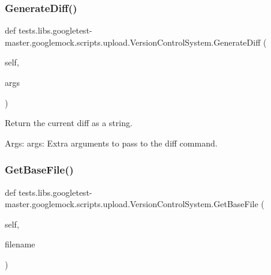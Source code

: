 \subsubsection{\texorpdfstring{Generate\+Diff()}{GenerateDiff()}}
{\footnotesize\ttfamily def tests.\+libs.\+googletest-\/master.\+googlemock.\+scripts.\+upload.\+Version\+Control\+System.\+Generate\+Diff (\begin{DoxyParamCaption}\item[{}]{self,  }\item[{}]{args }\end{DoxyParamCaption})}

\begin{DoxyVerb}Return the current diff as a string.

Args:
  args: Extra arguments to pass to the diff command.
\end{DoxyVerb}
 \mbox{\label{classtests_1_1libs_1_1googletest-master_1_1googlemock_1_1scripts_1_1upload_1_1VersionControlSystem_a1b8b71612a810da0d5680937b727c5e3}} 
\subsubsection{\texorpdfstring{Get\+Base\+File()}{GetBaseFile()}}
{\footnotesize\ttfamily def tests.\+libs.\+googletest-\/master.\+googlemock.\+scripts.\+upload.\+Version\+Control\+System.\+Get\+Base\+File (\begin{DoxyParamCaption}\item[{}]{self,  }\item[{}]{filename }\end{DoxyParamCaption})}

